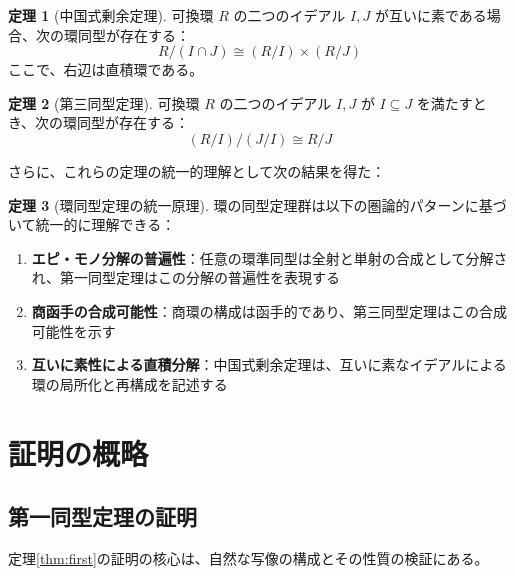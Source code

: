 \documentclass[uplatex, a4paper]{jlreq}
\theoremstyle{definition}
\newtheorem{theorem}{定理}[section]
\begin{document}
\begin{theorem}[中国式剰余定理]\label{thm:chinese}
可換環 $R$ の二つのイデアル $I, J$ が互いに素である場合、次の環同型が存在する：
\[
R/(I \cap J) \cong (R/I) \times (R/J)
\]
ここで、右辺は直積環である。
\end{theorem}

\begin{theorem}[第三同型定理]\label{thm:third}
可換環 $R$ の二つのイデアル $I, J$ が $I \subseteq J$ を満たすとき、次の環同型が存在する：
\[
(R/I)/(J/I) \cong R/J
\]
\end{theorem}

さらに、これらの定理の統一的理解として次の結果を得た：

\begin{theorem}[環同型定理の統一原理]\label{thm:unified}
環の同型定理群は以下の圏論的パターンに基づいて統一的に理解できる：
\begin{enumerate}
\item \textbf{エピ・モノ分解の普遍性}：任意の環準同型は全射と単射の合成として分解され、第一同型定理はこの分解の普遍性を表現する
\item \textbf{商函手の合成可能性}：商環の構成は函手的であり、第三同型定理はこの合成可能性を示す
\item \textbf{互いに素性による直積分解}：中国式剰余定理は、互いに素なイデアルによる環の局所化と再構成を記述する
\end{enumerate}
\end{theorem}

\section{証明の概略}

\subsection{第一同型定理の証明}

定理\ref{thm:first}の証明の核心は、自然な写像の構成とその性質の検証にある。
\end{document}
